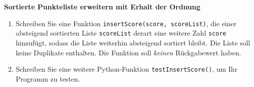 \textbf{Sortierte Punkteliste erweitern mit Erhalt der Ordnung}
\begin{enumerate}
	\item Schreiben Sie eine Funktion \verb|insertScore(score, scoreList)|, die einer absteigend sortierten Liste \verb|scoreList| derart eine weitere Zahl \verb|score| hinzufügt, sodass die Liste weiterhin absteigend sortiert bleibt. Die Liste soll keine Duplikate enthalten. Die Funktion soll \textit{keinen} Rückgabewert haben.
	\item Schreiben Sie eine weitere Python-Funktion \texttt{testInsertScore()}, um Ihr Programm zu testen.
\end{enumerate}
